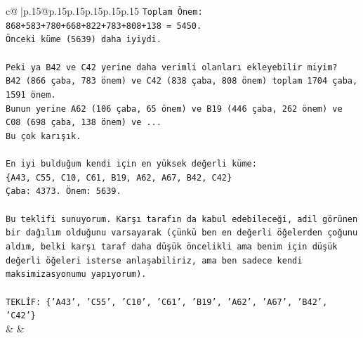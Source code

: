 \documentclass{article}
\begin{document}
{\begin{supertabular}{c@{$\;$}|p{.15\linewidth}@{}p{.15\linewidth}p{.15\linewidth}p{.15\linewidth}p{.15\linewidth}p{.15\linewidth}}
{{{\texttt{Toplam Önem: 868+583+780+668+822+783+808+138 = 5450.} \\
\texttt{Önceki küme (5639) daha iyiydi.} \\
\\ 
\texttt{Peki ya B42 ve C42 yerine daha verimli olanları ekleyebilir miyim?} \\
\texttt{B42 (866 çaba, 783 önem) ve C42 (838 çaba, 808 önem) toplam 1704 çaba, 1591 önem.} \\
\texttt{Bunun yerine A62 (106 çaba, 65 önem) ve B19 (446 çaba, 262 önem) ve C08 (698 çaba, 138 önem) ve ...} \\
\texttt{Bu çok karışık.} \\
\\ 
\texttt{En iyi bulduğum kendi için en yüksek değerli küme:} \\
\texttt{\{A43, C55, C10, C61, B19, A62, A67, B42, C42\}} \\
\texttt{Çaba: 4373. Önem: 5639.} \\
\\ 
\texttt{Bu teklifi sunuyorum. Karşı tarafın da kabul edebileceği, adil görünen bir dağılım olduğunu varsayarak (çünkü ben en değerli öğelerden çoğunu aldım, belki karşı taraf daha düşük öncelikli ama benim için düşük değerli öğeleri isterse anlaşabiliriz, ama ben sadece kendi maksimizasyonumu yapıyorum).} \\
\\ 
\texttt{TEKLİF: \{'A43', 'C55', 'C10', 'C61', 'B19', 'A62', 'A67', 'B42', 'C42'\}} \\
            }
        }
    }
    & & \\ \\


\end{supertabular}}
\end{document}
